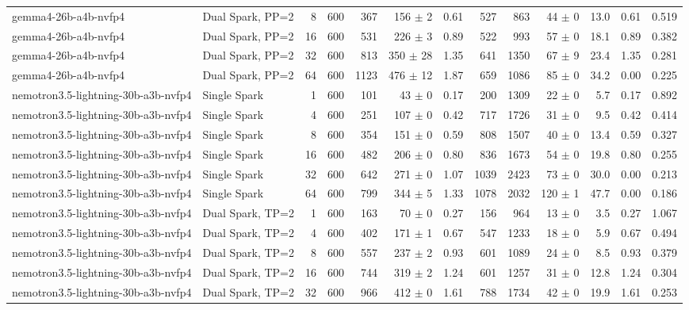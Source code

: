 \begin{tabular}{l l r r r r r r r r r r r}
gemma4-26b-a4b-nvfp4 & Dual Spark, PP=2 & 8 & 600 & 367 & 156 $\pm$ 2 & 0.61 & 527 & 863 & 44 $\pm$ 0 & 13.0 & 0.61 & 0.519 \\
gemma4-26b-a4b-nvfp4 & Dual Spark, PP=2 & 16 & 600 & 531 & 226 $\pm$ 3 & 0.89 & 522 & 993 & 57 $\pm$ 0 & 18.1 & 0.89 & 0.382 \\
gemma4-26b-a4b-nvfp4 & Dual Spark, PP=2 & 32 & 600 & 813 & 350 $\pm$ 28 & 1.35 & 641 & 1350 & 67 $\pm$ 9 & 23.4 & 1.35 & 0.281 \\
gemma4-26b-a4b-nvfp4 & Dual Spark, PP=2 & 64 & 600 & 1123 & 476 $\pm$ 12 & 1.87 & 659 & 1086 & 85 $\pm$ 0 & 34.2 & 0.00 & 0.225 \\
\addlinespace
nemotron3.5-lightning-30b-a3b-nvfp4 & Single Spark & 1 & 600 & 101 & 43 $\pm$ 0 & 0.17 & 200 & 1309 & 22 $\pm$ 0 & 5.7 & 0.17 & 0.892 \\
nemotron3.5-lightning-30b-a3b-nvfp4 & Single Spark & 4 & 600 & 251 & 107 $\pm$ 0 & 0.42 & 717 & 1726 & 31 $\pm$ 0 & 9.5 & 0.42 & 0.414 \\
nemotron3.5-lightning-30b-a3b-nvfp4 & Single Spark & 8 & 600 & 354 & 151 $\pm$ 0 & 0.59 & 808 & 1507 & 40 $\pm$ 0 & 13.4 & 0.59 & 0.327 \\
nemotron3.5-lightning-30b-a3b-nvfp4 & Single Spark & 16 & 600 & 482 & 206 $\pm$ 0 & 0.80 & 836 & 1673 & 54 $\pm$ 0 & 19.8 & 0.80 & 0.255 \\
nemotron3.5-lightning-30b-a3b-nvfp4 & Single Spark & 32 & 600 & 642 & 271 $\pm$ 0 & 1.07 & 1039 & 2423 & 73 $\pm$ 0 & 30.0 & 0.00 & 0.213 \\
nemotron3.5-lightning-30b-a3b-nvfp4 & Single Spark & 64 & 600 & 799 & 344 $\pm$ 5 & 1.33 & 1078 & 2032 & 120 $\pm$ 1 & 47.7 & 0.00 & 0.186 \\
\addlinespace
nemotron3.5-lightning-30b-a3b-nvfp4 & Dual Spark, TP=2 & 1 & 600 & 163 & 70 $\pm$ 0 & 0.27 & 156 & 964 & 13 $\pm$ 0 & 3.5 & 0.27 & 1.067 \\
nemotron3.5-lightning-30b-a3b-nvfp4 & Dual Spark, TP=2 & 4 & 600 & 402 & 171 $\pm$ 1 & 0.67 & 547 & 1233 & 18 $\pm$ 0 & 5.9 & 0.67 & 0.494 \\
nemotron3.5-lightning-30b-a3b-nvfp4 & Dual Spark, TP=2 & 8 & 600 & 557 & 237 $\pm$ 2 & 0.93 & 601 & 1089 & 24 $\pm$ 0 & 8.5 & 0.93 & 0.379 \\
nemotron3.5-lightning-30b-a3b-nvfp4 & Dual Spark, TP=2 & 16 & 600 & 744 & 319 $\pm$ 2 & 1.24 & 601 & 1257 & 31 $\pm$ 0 & 12.8 & 1.24 & 0.304 \\
nemotron3.5-lightning-30b-a3b-nvfp4 & Dual Spark, TP=2 & 32 & 600 & 966 & 412 $\pm$ 0 & 1.61 & 788 & 1734 & 42 $\pm$ 0 & 19.9 & 1.61 & 0.253 \\

\end{tabular}

